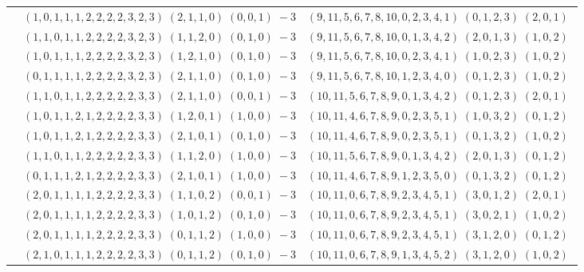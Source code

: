 \documentclass[11pt]{article}
\begin{document}
\begin{longtable}[l]{|c|c|c|}
 \cline{2-3} 
 & $(1 ,0 ,1 ,1 ,1 ,2 ,2 ,2 ,2 ,3 ,2 ,3) \;(2 ,1 ,1 ,0) \;(0 ,0 ,1) \;-3$ & $(9 ,11 ,5 ,6 ,7 ,8 ,10 ,0 ,2 ,3 ,4 ,1) \;(0 ,1 ,2 ,3) \;(2 ,0 ,1) \;$\\ 
 \cline{2-3} 
 & $(1 ,1 ,0 ,1 ,1 ,2 ,2 ,2 ,2 ,3 ,2 ,3) \;(1 ,1 ,2 ,0) \;(0 ,1 ,0) \;-3$ & $(9 ,11 ,5 ,6 ,7 ,8 ,10 ,0 ,1 ,3 ,4 ,2) \;(2 ,0 ,1 ,3) \;(1 ,0 ,2) \;$\\ 
 \cline{2-3} 
 & $(1 ,0 ,1 ,1 ,1 ,2 ,2 ,2 ,2 ,3 ,2 ,3) \;(1 ,2 ,1 ,0) \;(0 ,1 ,0) \;-3$ & $(9 ,11 ,5 ,6 ,7 ,8 ,10 ,0 ,2 ,3 ,4 ,1) \;(1 ,0 ,2 ,3) \;(1 ,0 ,2) \;$\\ 
 \cline{2-3} 
 & $(0 ,1 ,1 ,1 ,1 ,2 ,2 ,2 ,2 ,3 ,2 ,3) \;(2 ,1 ,1 ,0) \;(0 ,1 ,0) \;-3$ & $(9 ,11 ,5 ,6 ,7 ,8 ,10 ,1 ,2 ,3 ,4 ,0) \;(0 ,1 ,2 ,3) \;(1 ,0 ,2) \;$\\ 
 \cline{2-3} 
 & $(1 ,1 ,0 ,1 ,1 ,2 ,2 ,2 ,2 ,2 ,3 ,3) \;(2 ,1 ,1 ,0) \;(0 ,0 ,1) \;-3$ & $(10 ,11 ,5 ,6 ,7 ,8 ,9 ,0 ,1 ,3 ,4 ,2) \;(0 ,1 ,2 ,3) \;(2 ,0 ,1) \;$\\ 
 \cline{2-3} 
 & $(1 ,0 ,1 ,1 ,2 ,1 ,2 ,2 ,2 ,2 ,3 ,3) \;(1 ,2 ,0 ,1) \;(1 ,0 ,0) \;-3$ & $(10 ,11 ,4 ,6 ,7 ,8 ,9 ,0 ,2 ,3 ,5 ,1) \;(1 ,0 ,3 ,2) \;(0 ,1 ,2) \;$\\ 
 \cline{2-3} 
 & $(1 ,0 ,1 ,1 ,2 ,1 ,2 ,2 ,2 ,2 ,3 ,3) \;(2 ,1 ,0 ,1) \;(0 ,1 ,0) \;-3$ & $(10 ,11 ,4 ,6 ,7 ,8 ,9 ,0 ,2 ,3 ,5 ,1) \;(0 ,1 ,3 ,2) \;(1 ,0 ,2) \;$\\ 
 \cline{2-3} 
 & $(1 ,1 ,0 ,1 ,1 ,2 ,2 ,2 ,2 ,2 ,3 ,3) \;(1 ,1 ,2 ,0) \;(1 ,0 ,0) \;-3$ & $(10 ,11 ,5 ,6 ,7 ,8 ,9 ,0 ,1 ,3 ,4 ,2) \;(2 ,0 ,1 ,3) \;(0 ,1 ,2) \;$\\ 
 \cline{2-3} 
 & $(0 ,1 ,1 ,1 ,2 ,1 ,2 ,2 ,2 ,2 ,3 ,3) \;(2 ,1 ,0 ,1) \;(1 ,0 ,0) \;-3$ & $(10 ,11 ,4 ,6 ,7 ,8 ,9 ,1 ,2 ,3 ,5 ,0) \;(0 ,1 ,3 ,2) \;(0 ,1 ,2) \;$\\ 
 \cline{2-3} 
 & $(2 ,0 ,1 ,1 ,1 ,1 ,2 ,2 ,2 ,2 ,3 ,3) \;(1 ,1 ,0 ,2) \;(0 ,0 ,1) \;-3$ & $(10 ,11 ,0 ,6 ,7 ,8 ,9 ,2 ,3 ,4 ,5 ,1) \;(3 ,0 ,1 ,2) \;(2 ,0 ,1) \;$\\ 
 \cline{2-3} 
 & $(2 ,0 ,1 ,1 ,1 ,1 ,2 ,2 ,2 ,2 ,3 ,3) \;(1 ,0 ,1 ,2) \;(0 ,1 ,0) \;-3$ & $(10 ,11 ,0 ,6 ,7 ,8 ,9 ,2 ,3 ,4 ,5 ,1) \;(3 ,0 ,2 ,1) \;(1 ,0 ,2) \;$\\ 
 \cline{2-3} 
 & $(2 ,0 ,1 ,1 ,1 ,1 ,2 ,2 ,2 ,2 ,3 ,3) \;(0 ,1 ,1 ,2) \;(1 ,0 ,0) \;-3$ & $(10 ,11 ,0 ,6 ,7 ,8 ,9 ,2 ,3 ,4 ,5 ,1) \;(3 ,1 ,2 ,0) \;(0 ,1 ,2) \;$\\ 
 \cline{2-3} 
 & $(2 ,1 ,0 ,1 ,1 ,1 ,2 ,2 ,2 ,2 ,3 ,3) \;(0 ,1 ,1 ,2) \;(0 ,1 ,0) \;-3$ & $(10 ,11 ,0 ,6 ,7 ,8 ,9 ,1 ,3 ,4 ,5 ,2) \;(3 ,1 ,2 ,0) \;(1 ,0 ,2) \;$\\ 

\end{longtable}
\end{document}
